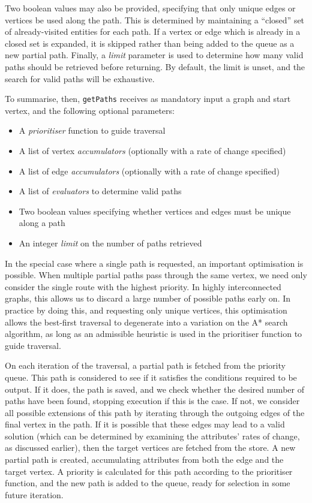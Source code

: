 Two boolean values may also be provided, specifying that only unique edges or
vertices be used along the path. This is determined by maintaining a
``closed'' set of already-visited entities for each path. If a vertex or edge
which is already in a closed set is expanded, it is skipped rather than being
added to the queue as a new partial path.  Finally, a \textit{limit} parameter
is used to determine how many valid paths should be retrieved before
returning. By default, the limit is unset, and the search for valid paths will
be exhaustive.

To summarise, then, \texttt{getPaths} receives as mandatory input a graph and
start vertex, and the following optional parameters:

\begin{itemize}
    \item A \textit{prioritiser} function to guide traversal
    \item A list of vertex \textit{accumulators} (optionally with a rate of change specified)
    \item A list of edge \textit{accumulators} (optionally with a rate of change specified)
    \item A list of \textit{evaluators} to determine valid paths
    \item Two boolean values specifying whether vertices and edges must be unique along a path
    \item An integer \textit{limit} on the number of paths retrieved
\end{itemize}


In the special case where a single path is requested, an important
optimisation is possible. When multiple partial paths pass through the same
vertex, we need only consider the single route with the highest priority. In highly
interconnected graphs, this allows us to discard a large number of possible
paths early on. In practice by doing this, and requesting only unique
vertices, this  optimisation allows the best-first traversal to degenerate
into a variation on the A* search algorithm, as long as an admissible
heuristic is used in the prioritiser function to guide traversal.

On each iteration of the traversal, a partial path is fetched from the
priority queue. This path is considered to see if it satisfies the conditions
required to be output. If it does, the path is saved, and we check whether the
desired number of paths have been found, stopping execution if this is the
case. If not, we consider all possible extensions of this path by iterating
through the outgoing edges of the final vertex in the path. If it is possible
that these edges may lead to a valid solution (which can be determined by
examining the attributes' rates of change, as discussed earlier), then the
target vertices are fetched from the store. A new partial path is created,
accumulating attributes from both the edge and the target vertex. A priority
is calculated for this path according to the prioritiser function,  and the
new path is added to the queue, ready for selection in some future iteration.

